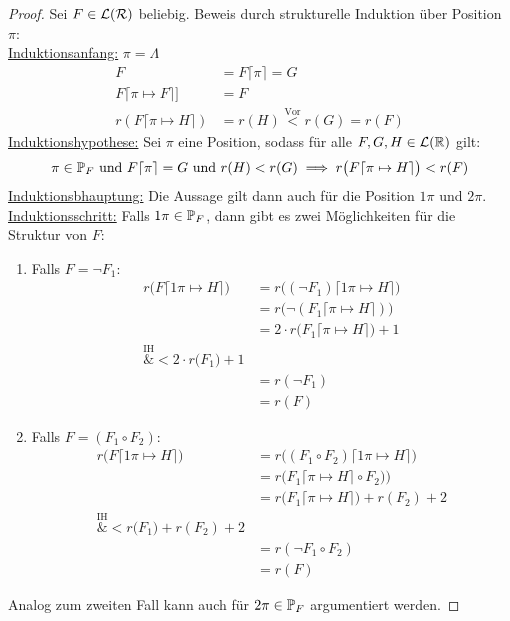 \begin{proof}
	Sei $F\in\L(\RR)$ beliebig.
	Beweis durch strukturelle Induktion über Position $\pi$:\\
	\ul{Induktionsanfang:} $\pi=\Lambda$
	\begin{align*}
		F&=F\lceil\pi\rceil=G\\
		F\lceil\pi\mapsto F\rceil]&=F\\
		r(F\lceil\pi\mapsto H\rceil)&=r(H)\stackrel{\text{Vor}}{<}r(G)=r(F)
	\end{align*}
	\ul{Induktionshypothese:} Sei $\pi$ eine Position, sodass für alle $F,G,H\in\L(\R)$ gilt:
	\begin{align*}
		\pi\in\P_F\text{ und }F\lceil\pi\rceil=G\text{ und } r(H)<r(G)\implies r\big(F\lceil\pi\mapsto H\rceil\big)<r(F)
	\end{align*}
	\ul{Induktionsbhauptung:} Die Aussage gilt dann auch für die Position $1\pi$ und $2\pi$.\nl
	\ul{Induktionsschritt:} Falls $1\pi\in\P_F$, dann gibt es zwei Möglichkeiten für die Struktur von $F$:
	\begin{enumerate}
		\item Falls $F=\neg F_1$:
			\begin{align*}
				r\big(F\lceil1\pi\mapsto H\rceil\big)
				&=r\big((\neg F_1)\lceil1\pi\mapsto H\rceil\big)\\
				&=r\big(\neg(F_1\lceil\pi\mapsto H\rceil)\big)\\
				&=2\cdot r\big(F_1\lceil\pi\mapsto H\rceil\big)+1\\
				\overset{\text{IH}}&{<}
				2\cdot r\big(F_1\big)+1\\
				&=r(\neg F_1)\\
				&=r(F)
			\end{align*}
		\item Falls $F=(F_1\circ F_2)$:
			\begin{align*}
				r\big(F\lceil1\pi\mapsto H\rceil\big)
				&=r\big((F_1\circ F_2)\lceil1\pi\mapsto H\rceil\big)\\
				&=r\big(F_1\lceil\pi\mapsto H\rceil\circ F_2)\big)\\
				&=r\big(F_1\lceil\pi\mapsto H\rceil\big)+r(F_2)+2\\
				\overset{\text{IH}}&{<}
				r\big(F_1\big)+r(F_2)+2\\
				&=r(\neg F_1\circ F_2)\\
				&=r(F)
			\end{align*}
	\end{enumerate}
	Analog zum zweiten Fall kann auch für $2\pi\in\P_F$ argumentiert werden.
\end{proof}


